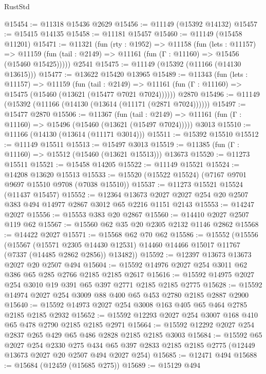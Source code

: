 \begin{lexlean}{RustStd}
\begin{coremodule}
@15454 := @11318 @15436 @2629
@15456 := @11149 (@15392 @14132)
@15457 := @15415 @14135
@15458 := @11181 @15457
@15460 := @11149 (@15458 @11201)
@15471 := @11321
    (fun (rty : @1952) =>
    @11158
      (fun (lets : @11157) =>
      @11159 (fun (tail : @2149) => @11161 (fun (Γ : @11160) => @15456 (@15460 @15425)))))
    @2541
@15475 := @11149 (@15392 (@11166 (@14130 @13615)))
@15477 := @13622 @15420 @13965
@15489 := @11343
    (fun (lets : @11157) =>
    @11159
      (fun (tail : @2149) =>
      @11161 (fun (Γ : @11160) => @15475 (@15460 (@13621 (@15477 @7021 @7024))))))
    @2870
@15496 := @11149 (@15392 (@11166 (@14130 (@13614 (@11171 (@2871 @7024))))))
@15497 := @15477 @2870
@15506 := @11367
    (fun (tail : @2149) => @11161 (fun (Γ : @11160) => @15496 (@15460 (@13621 (@15497 @7024)))))
    @3013
@15510 := @11166 (@14130 (@13614 (@11171 @3014)))
@15511 := @15392 @15510
@15512 := @11149 @15511
@15513 := @15497 @3013
@15519 := @11385 (fun (Γ : @11160) => @15512 (@15460 (@13621 @15513))) @13673
@15520 := @11273 @15511
@15521 := @15458 @14205
@15522 := @11149 @15521
@15524 := @14208 @13620 @15513
@15533 := @15520 (@15522 @15524) (@7167 @9701 @9697 @15510 @9708 (@7038 @15510))
@15537 := @11273 @15521 @15524 (@11437 @15457)
@15552 := @12364
    @13673
    @2027
    @2027
    @254
    @20
    @2507
    @383
    @494
    @14977
    @2867
    @3012
    @65
    @2216
    @1151
    @2143
@15553 := @14247 @2027
@15556 := @15553 @383 @20 @2867
@15560 := @14410 @2027 @2507 @119 @62
@15567 := @15560 @62 @35 @20 @2305 @2132 @1146 @2862
@15568 := @14422 @2027
@15571 := @15568 @62 @70 @62
@15586 := @15552
    (@15556
      (@15567
        (@15571 @2305 @14430 @12531)
        @14460
        @14466
        @15017
        @11767
        (@7337 (@14485 @2862 @2856))
        @13482))
@15592 := @12397 @13673 @13673 @2027 @20 @2507 @494
@15604 := @15592 @14976 @2027 @254 @3011 @62 @386 @65 @285 @2766 @2185 @2185 @2617
@15616 := @15592 @14975 @2027 @254 @3010 @19 @391 @65 @397 @2771 @2185 @2185 @2775
@15628 := @15592 @14974 @2027 @254 @3009 @88 @400 @65 @453 @2780 @2185 @2887 @2900
@15640 := @15592 @14973 @2027 @254 @3008 @163 @405 @65 @464 @2785 @2185 @2185 @2932
@15652 := @15592 @12293 @2027 @254 @3007 @168 @410 @65 @478 @2790 @2185 @2185 @2971
@15664 := @15592 @12292 @2027 @254 @2837 @265 @429 @65 @486 @2828 @2185 @2185 @3003
@15684 := @15592
    @65
    @2027
    @254
    @2330
    @275
    @434
    @65
    @397
    @2833
    @2185
    @2185
    @2775
    (@12449 @13673 @2027 @20 @2507 @494 @2027 @254)
@15685 := @12471 @494
@15688 := @15684 (@12459 (@15685 @275))
@15689 := @15129 @494

\end{coremodule}
\end{lexlean}
